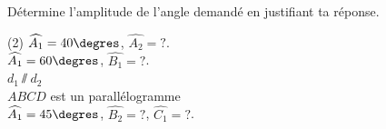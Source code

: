 \documentclass[a4paper,fontsize=12pt, parskip=half]{scrartcl}
\begin{document}
\newpage
\begin{exercise}
    Détermine l'amplitude de l'angle demandé en justifiant ta réponse.
    \begin{tasks}(2)
        \task $\widehat{A_1}=40\degres$, $\widehat{A_2} = ?$.\\
        \task $\widehat{A_1}=60\degres$, $\widehat{B_1} = ?$.
        \\$d_1\sslash d_2$\\
            \task $ABCD$ est un parallélogramme \\ $\widehat{A_1}=45\degres$, $\widehat{B_2} = ?$, $\widehat{C_1}=?$.
        \\
    \end{tasks}
\end{exercise}
\end{document}
